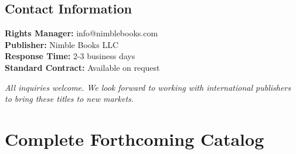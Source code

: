 \documentclass[11pt]{article}
\begin{document}
\subsection{Contact Information}
\textbf{Rights Manager:} info@nimblebooks.com\\
\textbf{Publisher:} Nimble Books LLC\\
\textbf{Response Time:} 2-3 business days\\
\textbf{Standard Contract:} Available on request\\

\vspace{1cm}
\begin{center}
\textit{All inquiries welcome. We look forward to working with international publishers to bring these titles to new markets.}
\end{center}

\newpage

\appendix
\section{Complete Forthcoming Catalog}

\end{document}
